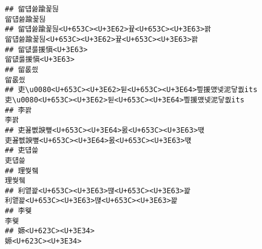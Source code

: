 \documentclass[]{article}
\begin{document}
\begin{verbatim}
## 留덉쓣踰꾩뒪                                                                                                                                                                                                     留덉쓣踰꾩뒪
## 留덉쓣踰꾩뒪<U+653C><U+3E62>끂<U+653C><U+3E63>꽑                                                                                                                                                     留덉쓣踰꾩뒪<U+653C><U+3E62>끂<U+653C><U+3E63>꽑
## 留덊룷援愼<U+3E63>                                                                                                                                                                                               留덊룷援愼<U+3E63>
## 留롮씠                                                                                                                                                                                                                 留롮씠
## 吏\u0080<U+653C><U+3E62>뒫<U+653C><U+3E64>삎援먰넻泥닿퀎its                                                                                                                               吏\u0080<U+653C><U+3E62>뒫<U+653C><U+3E64>삎援먰넻泥닿퀎its
## 李꽑                                                                                                                                                                                                                     李꽑
## 吏꾪뻾諛뼢<U+653C><U+3E64>몴<U+653C><U+3E63>떇                                                                                                                                                         吏꾪뻾諛뼢<U+653C><U+3E64>몴<U+653C><U+3E63>떇
## 吏덉쓽                                                                                                                                                                                                                 吏덉쓽
## 理쒖쥌                                                                                                                                                                                                                 理쒖쥌
## 利앹꽕<U+653C><U+3E63>떊<U+653C><U+3E63>꽕                                                                                                                                                                 利앹꽕<U+653C><U+3E63>떊<U+653C><U+3E63>꽕
## 李웾                                                                                                                                                                                                                     李웾
## 嫄<U+623C><U+3E34>                                                                                                                                                                                                     嫄<U+623C><U+3E34>

\end{verbatim}
\end{document}
